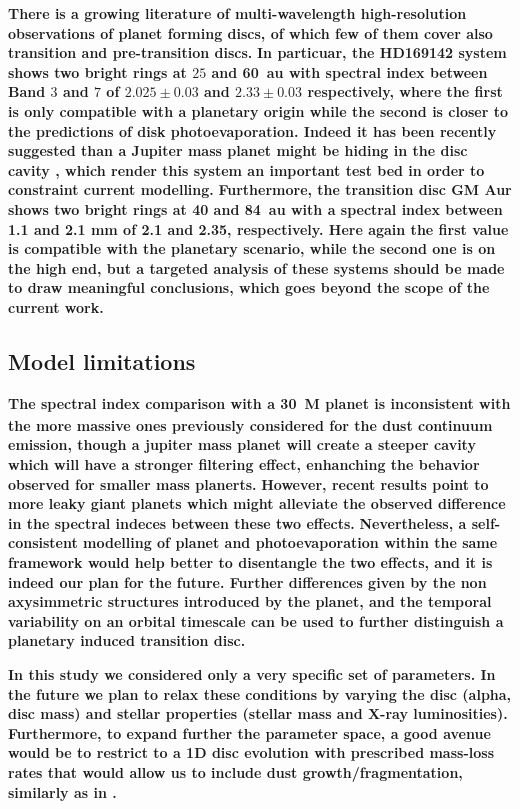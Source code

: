 \documentclass[fleqn,usenatbib]{mnras}
\begin{document}
    \textbf{There is a growing literature of multi-wavelength high-resolution observations of planet forming discs, of which few of them cover also transition and pre-transition discs.} 
    \textbf{In particuar, the HD169142 system \citep{Macias2019} shows two bright rings at $25$ and \SI{60}{au} with spectral index between Band $3$ and $7$ of $2.025\pm0.03$ and $2.33\pm0.03$ respectively, where the first is only compatible with a planetary origin while the second is closer to the predictions of disk photoevaporation. Indeed it has been recently suggested than a Jupiter mass planet might be hiding in the disc cavity \citep{Hammond2023}, which render this system an important test bed in order to constraint current modelling.} 
    \textbf{Furthermore, the transition disc GM Aur \citep{Huang2020} shows two bright rings at 40 and \SI{84}{au} with a spectral index between 1.1 and 2.1 mm of 2.1 and 2.35, respectively. Here again the first value is compatible with the planetary scenario, while the second one is on the high end, but a targeted analysis of these systems should be made to draw meaningful conclusions, which goes beyond the scope of the current work.}

    \subsection{Model limitations}

    \textbf{The spectral index comparison with a \SI{30}{M_\oplus} planet is inconsistent with the more massive ones previously considered for the dust continuum emission, though a jupiter mass planet will create a steeper cavity which will have a stronger filtering effect, enhanching the behavior observed for smaller mass planerts.}
    \textbf{However, recent results point to more leaky giant planets \citep[see e.g.][]{Stammler2023} which might alleviate the observed difference in the spectral indeces between these two effects.}
    \textbf{Nevertheless, a self-consistent modelling of planet and photoevaporation within the same framework would help better to disentangle the two effects, and it is indeed our plan for the future. Further differences given by the non axysimmetric structures introduced by the planet, and the temporal variability on an orbital timescale can be used to further distinguish a planetary induced transition disc.}

    \textbf{In this study we considered only a very specific set of parameters. In the future we plan to relax these conditions by varying the disc (alpha, disc mass) and stellar properties (stellar mass and X-ray luminosities). Furthermore, to expand further the parameter space, a good avenue would be to restrict to a 1D disc evolution with prescribed mass-loss rates that would allow us to include dust growth/fragmentation, similarly as in \citet{Garate2021}.}
\end{document}
